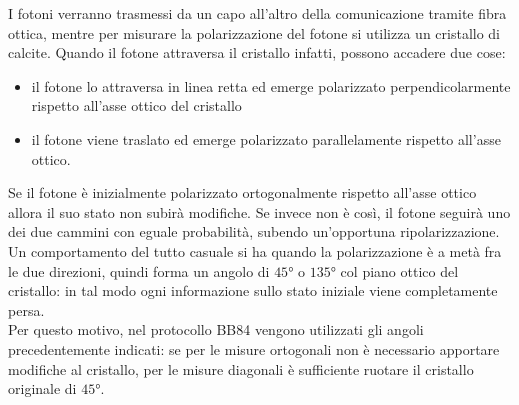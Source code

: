 \documentclass[italian,A4,12pt]{article}
\begin{document}
    I fotoni verranno trasmessi da un capo all'altro della comunicazione tramite fibra ottica, mentre per misurare la polarizzazione del fotone si utilizza un cristallo di calcite. Quando il fotone attraversa il cristallo infatti, possono accadere due cose:
    \begin{itemize}
      \item il fotone lo attraversa in linea retta ed emerge polarizzato perpendicolarmente rispetto all'asse ottico del cristallo
      \item il fotone viene traslato ed emerge polarizzato parallelamente rispetto all'asse ottico.
    \end{itemize}
    Se il fotone è inizialmente polarizzato ortogonalmente rispetto all'asse ottico allora il suo stato non subirà modifiche. Se invece non è così, il fotone seguirà uno dei due cammini con eguale probabilità, subendo un'opportuna ripolarizzazione. Un comportamento del tutto casuale si ha quando la polarizzazione è a metà fra le due direzioni, quindi forma un angolo di $\ang{45}$ o $\ang{135}$ col piano ottico del cristallo: in tal modo ogni informazione sullo stato iniziale viene completamente persa.\\
    Per questo motivo, nel protocollo BB84 vengono utilizzati gli angoli precedentemente indicati: se per le misure ortogonali non è necessario apportare modifiche al cristallo, per le misure diagonali è sufficiente ruotare il cristallo originale di $\ang{45}$.
\end{document}
